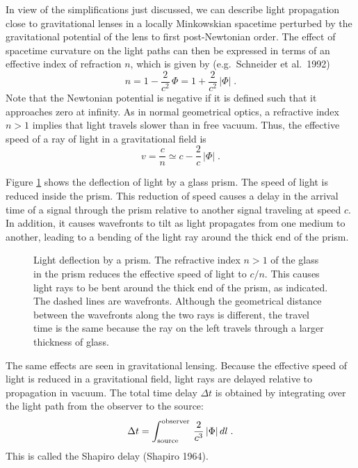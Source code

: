 \documentclass[a4paper,10pt]{article} %
\begin{document}
In view of the simplifications just discussed, we can describe light
propagation close to gravitational lenses in a locally Minkowskian
spacetime perturbed by the gravitational potential of the lens to
first post-Newtonian order. The effect of spacetime curvature on the
light paths can then be expressed in terms of an effective index of
refraction $n$, which is given by (e.g.\ Schneider et al.\ 1992)
\begin{equation}
  n = 1 - \frac{2}{c^2}\,\Phi = 1 + \frac{2}{c^2}\,|\Phi|\;.
\label{eq:2.1}
\end{equation}
Note that the Newtonian potential is negative if it is defined such
that it approaches zero at infinity. As in normal geometrical optics,
a refractive index $n>1$ implies that light travels slower than in
free vacuum. Thus, the effective speed of a ray of light in a
gravitational field is
\begin{equation}
  v = \frac{c}{n} \simeq c - \frac{2}{c}\,|\Phi|\;.
\label{eq:2.2}
\end{equation}

Figure \ref{NB:fig2.1} shows the deflection of light by a glass prism.
The speed of light is reduced inside the prism. This reduction of
speed causes a delay in the arrival time of a signal through the prism
relative to another signal traveling at speed $c$. In addition, it
causes wavefronts to tilt as light propagates from one medium to
another, leading to a bending of the light ray around the thick end of
the prism.

\begin{figure}[ht] %
\begin{center}
\begin{minipage}[t]{0.6\hsize}
\end{minipage}
\end{center}
\caption{Light deflection by a prism. The refractive index $n>1$ of
  the glass in the prism reduces the effective speed of light to
  $c/n$. This causes light rays to be bent around the thick end of the
  prism, as indicated. The dashed lines are wavefronts. Although the
  geometrical distance between the wavefronts along the two rays is
  different, the travel time is the same because the ray on the left
  travels through a larger thickness of glass.}
\label{NB:fig2.1}
\end{figure}

The same effects are seen in gravitational lensing. Because the
effective speed of light is reduced in a gravitational field, light
rays are delayed relative to propagation in vacuum. The total time
delay $\Delta t$ is obtained by integrating over the light path from
the observer to the source:
\begin{equation}
  \Delta t = \int_{\rm source}^{\rm observer}\,
  \frac{2}{c^3}\,|\Phi|\,dl\;.
\label{eq:2.4}
\end{equation}
This is called the Shapiro delay (Shapiro 1964).
\end{document}
